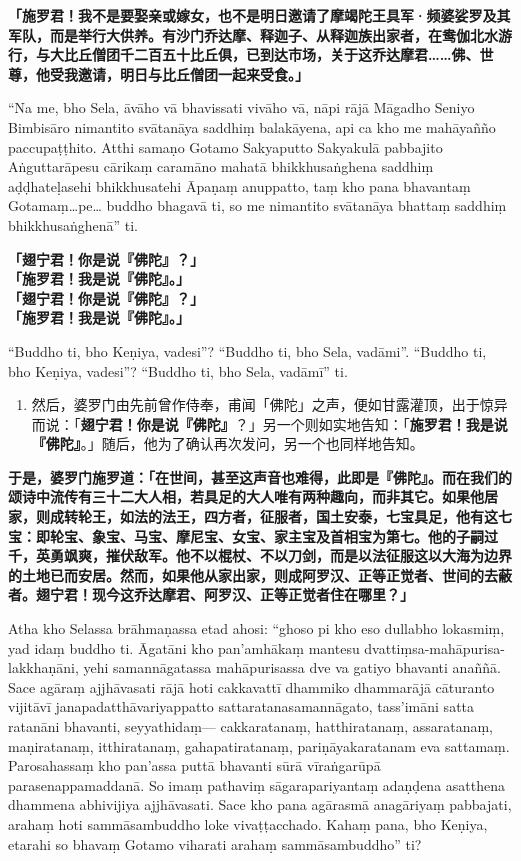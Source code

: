 \textbf{「施罗君！我不是要娶亲或嫁女，也不是明日邀请了摩竭陀王具军·频婆娑罗及其军队，而是举行大供养。有沙门乔达摩、释迦子、从释迦族出家者，在鸯伽北水游行，与大比丘僧团千二百五十比丘俱，已到达市场，关于这乔达摩君……佛、世尊，他受我邀请，明日与比丘僧团一起来受食。」}

“Na me, bho Sela, āvāho vā bhavissati vivāho vā, nāpi rājā Māgadho Seniyo Bimbisāro nimantito svātanāya saddhiṃ balakāyena, api ca kho me mahāyañño paccupaṭṭhito. Atthi samaṇo Gotamo Sakyaputto Sakyakulā pabbajito Aṅguttarāpesu cārikaṃ caramāno mahatā bhikkhusaṅghena saddhiṃ aḍḍhateḷasehi bhikkhusatehi Āpaṇaṃ anuppatto, taṃ kho pana bhavantaṃ Gotamaṃ…pe… buddho bhagavā ti, so me nimantito svātanāya bhattaṃ saddhiṃ bhikkhusaṅghenā” ti.

\textbf{「翅宁君！你是说『佛陀』？」\\}
\textbf{「施罗君！我是说『佛陀』。」\\}
\textbf{「翅宁君！你是说『佛陀』？」\\}
\textbf{「施罗君！我是说『佛陀』。」}

“Buddho ti, bho Keṇiya, vadesi”? “Buddho ti, bho Sela, vadāmi”. “Buddho ti, bho Keṇiya, vadesi”? “Buddho ti, bho Sela, vadāmī” ti.

\begin{enumerate}\item 然后，婆罗门由先前曾作侍奉，甫闻「佛陀」之声，便如甘露灌顶，出于惊异而说：「\textbf{翅宁君！你是说『佛陀』}？」另一个则如实地告知：「\textbf{施罗君！我是说『佛陀』}。」随后，他为了确认再次发问，另一个也同样地告知。\end{enumerate}

\textbf{于是，婆罗门施罗道：「在世间，甚至这声音也难得，此即是『佛陀』。而在我们的颂诗中流传有三十二大人相，若具足的大人唯有两种趣向，而非其它。如果他居家，则成转轮王，如法的法王，四方者，征服者，国土安泰，七宝具足，他有这七宝：即轮宝、象宝、马宝、摩尼宝、女宝、家主宝及首相宝为第七。他的子嗣过千，英勇飒爽，摧伏敌军。他不以棍杖、不以刀剑，而是以法征服这以大海为边界的土地已而安居。然而，如果他从家出家，则成阿罗汉、正等正觉者、世间的去蔽者。翅宁君！现今这乔达摩君、阿罗汉、正等正觉者住在哪里？」}

Atha kho Selassa brāhmaṇassa etad ahosi: “ghoso pi kho eso dullabho lokasmiṃ, yad idaṃ buddho ti. Āgatāni kho pan’amhākaṃ mantesu dvattiṃsa-mahāpurisa-lakkhaṇāni, yehi samannāgatassa mahāpurisassa dve va gatiyo bhavanti anaññā. Sace agāraṃ ajjhāvasati rājā hoti cakkavattī dhammiko dhammarājā cāturanto vijitāvī janapadatthāvariyappatto sattaratanasamannāgato, tass’imāni satta ratanāni bhavanti, seyyathidaṃ— cakkaratanaṃ, hatthiratanaṃ, assaratanaṃ, maṇiratanaṃ, itthiratanaṃ, gahapatiratanaṃ, pariṇāyakaratanam eva sattamaṃ. Parosahassaṃ kho pan’assa puttā bhavanti sūrā vīraṅgarūpā parasenappamaddanā. So imaṃ pathaviṃ sāgarapariyantaṃ adaṇḍena asatthena dhammena abhivijiya ajjhāvasati. Sace kho pana agārasmā anagāriyaṃ pabbajati, arahaṃ hoti sammāsambuddho loke vivaṭṭacchado. Kahaṃ pana, bho Keṇiya, etarahi so bhavaṃ Gotamo viharati arahaṃ sammāsambuddho” ti?

